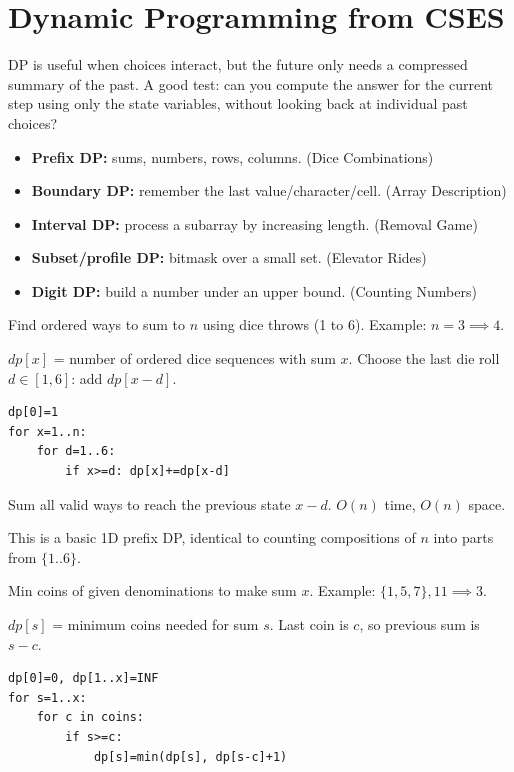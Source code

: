 \section{Dynamic Programming from CSES}

DP is useful when choices interact, but the future only needs a compressed summary of the past. A good test: can you compute the answer for the current step using only the state variables, without looking back at individual past choices?

\begin{itemize}
	\item \textbf{Prefix DP:} sums, numbers, rows, columns. (Dice Combinations)
	\item \textbf{Boundary DP:} remember the last value/character/cell. (Array Description)
	\item \textbf{Interval DP:} process a subarray by increasing length. (Removal Game)
	\item \textbf{Subset/profile DP:} bitmask over a small set. (Elevator Rides)
	\item \textbf{Digit DP:} build a number under an upper bound. (Counting Numbers)
\end{itemize}


\Problem Find ordered ways to sum to $n$ using dice throws (1 to 6). Example: $n=3 \implies 4$.

\State $dp[x]$ = number of ordered dice sequences with sum $x$.
\Trans Choose the last die roll $d\in[1,6]$: add $dp[x-d]$.
\begin{lstlisting}
dp[0]=1
for x=1..n:
    for d=1..6:
        if x>=d: dp[x]+=dp[x-d]
\end{lstlisting}

\Solution Sum all valid ways to reach the previous state $x-d$. $O(n)$ time, $O(n)$ space.

\Analysis This is a basic 1D prefix DP, identical to counting compositions of $n$ into parts from $\{1..6\}$.


\Problem Min coins of given denominations to make sum $x$. Example: $\{1,5,7\}, 11 \implies 3$.

\State $dp[s]$ = minimum coins needed for sum $s$.
\Trans Last coin is $c$, so previous sum is $s-c$.
\begin{lstlisting}
dp[0]=0, dp[1..x]=INF
for s=1..x:
    for c in coins:
        if s>=c:
            dp[s]=min(dp[s], dp[s-c]+1)
\end{lstlisting}

